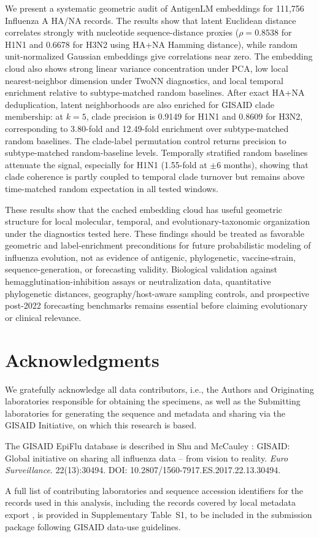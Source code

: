 \documentclass[11pt]{article}
\begin{document}
We present a systematic geometric audit of AntigenLM embeddings for 111,756 Influenza A HA/NA records. The results show that latent Euclidean distance correlates strongly with nucleotide sequence-distance proxies ($\rho=0.8538$ for H1N1 and 0.6678 for H3N2 using HA+NA Hamming distance), while random unit-normalized Gaussian embeddings give correlations near zero. The embedding cloud also shows strong linear variance concentration under PCA, low local nearest-neighbor dimension under TwoNN diagnostics, and local temporal enrichment relative to subtype-matched random baselines. After exact HA+NA deduplication, latent neighborhoods are also enriched for GISAID clade membership: at $k=5$, clade precision is 0.9149 for H1N1 and 0.8609 for H3N2, corresponding to 3.80-fold and 12.49-fold enrichment over subtype-matched random baselines. The clade-label permutation control returns precision to subtype-matched random-baseline levels. Temporally stratified random baselines attenuate the signal, especially for H1N1 (1.55-fold at $\pm 6$ months), showing that clade coherence is partly coupled to temporal clade turnover but remains above time-matched random expectation in all tested windows.

These results show that the cached embedding cloud has useful geometric structure for local molecular, temporal, and evolutionary-taxonomic organization under the diagnostics tested here. These findings should be treated as favorable geometric and label-enrichment preconditions for future probabilistic modeling of influenza evolution, not as evidence of antigenic, phylogenetic, vaccine-strain, sequence-generation, or forecasting validity. Biological validation against hemagglutination-inhibition assays or neutralization data, quantitative phylogenetic distances, geography/host-aware sampling controls, and prospective post-2022 forecasting benchmarks remains essential before claiming evolutionary or clinical relevance.

\section*{Acknowledgments}

We gratefully acknowledge all data contributors, i.e., the Authors and Originating laboratories responsible for obtaining the specimens, as well as the Submitting laboratories for generating the sequence and metadata and sharing via the GISAID Initiative, on which this research is based.

The GISAID EpiFlu database is described in Shu and McCauley \cite{shu2017gisaid}: GISAID: Global initiative on sharing all influenza data -- from vision to reality. \emph{Euro Surveillance}. 22(13):30494. DOI: 10.2807/1560-7917.ES.2017.22.13.30494.

A full list of contributing laboratories and sequence accession identifiers for the records used in this analysis, including the records covered by local metadata export , is provided in Supplementary Table~S1, to be included in the submission package following GISAID data-use guidelines.



\end{document}
